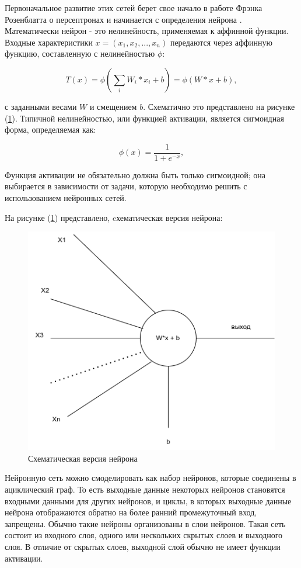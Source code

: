 Первоначальное развитие этих сетей берет свое начало в работе Фрэнка Розенблатта о персептронах и начинается с определения нейрона \cite{DOU2023484}. Математически нейрон - это нелинейность, применяемая к аффинной функции. Входные характеристики \(x = (x_1, x_2, . . . , x_n)\) передаются через аффинную функцию, составленную с нелинейностью \(\phi\):

\begin{equation}
    T(x) = \phi\left(\sum_{i} W_{i} \ast x_{i} + b\right) = \phi(W \ast x + b)
, \end{equation}

с заданными весами \(W\) и смещением \(b\). Схематично это представлено на рисунке (\ref{fig:neuron}). Типичной нелинейностью, или функцией активации, является сигмоидная форма, определяемая как:

\begin{equation}
    \phi(x) = \frac{1}{1 + e^{-x}}
, \end{equation}

Функция активации не обязательно должна быть только сигмоидной; она выбирается в зависимости от задачи, которую необходимо решить с использованием нейронных сетей.

На рисунке (\ref{fig:neuron}) представлено, cхематическая версия нейрона: 
\begin{figure}[H]
	\centering
	\includegraphics[width=0.5\linewidth]{assets/neuron.png}
	\caption{Схематическая версия нейрона}
	\label{fig:neuron}
\end{figure}

Нейронную сеть можно смоделировать как набор нейронов, которые соединены в ациклический граф. То есть выходные данные некоторых нейронов становятся входными данными для других нейронов, и циклы, в которых выходные данные нейрона отображаются обратно на более ранний промежуточный вход, запрещены. Обычно такие нейроны организованы в слои нейронов. Такая сеть состоит из входного слоя, одного или нескольких скрытых слоев и выходного слоя. В отличие от скрытых слоев, выходной слой обычно не имеет функции активации.


